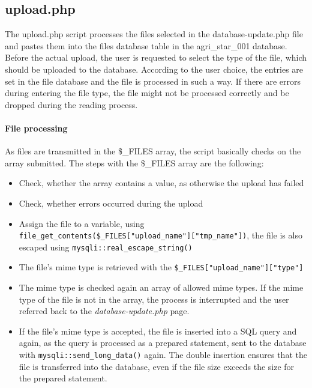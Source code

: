 \subsection{upload.php}
The upload.php script processes the files selected in the database-update.php file and pastes them into the files database table in the agri\_star\_001 database. Before the actual upload, 
the user is requested to select the type of the file, which should be uploaded to the database. According to the user choice, the entries are set in the file database and the file is processed 
in such a way. If there are errors during entering the file type, the file might not be processed correctly and be dropped during the reading process.
\paragraph{File processing}
As files are transmitted in the \$\_FILES array, the script basically checks on the array submitted. The steps with the \$\_FILES array are the following:
\begin{itemize}
 \item Check, whether the array contains a value, as otherwise the upload has failed
 \item Check, whether errors occurred during the upload
 \item Assign the file to a variable, using\\ \texttt{file\_get\_contents(\$\_FILES["upload\_name"]["tmp\_name"])}, the file is also escaped using \texttt{mysqli::real\_escape\_string()}
 \item The file's mime type is retrieved with the \texttt{\$\_FILES["upload\_name"]["type"]}
 \item The mime type is checked again an array of allowed mime types. If the mime type of the file is not in the array, the process is interrupted and the user referred back to the 
 \emph{database-update.php} page.
 \item If the file's mime type is accepted, the file is inserted into a SQL query and again, as the query is processed as a prepared statement, sent to the database with 
 \texttt{mysqli::send\_long\_data()} again. The double insertion ensures that the file is transferred into the database, even if the file size exceeds the size for the prepared statement.
\end{itemize}


